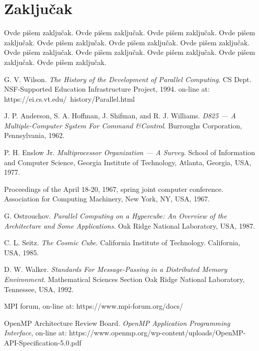 \documentclass[a4paper]{article}
\begin{document}
{	\section{Zaključak}
	\label{sec:zakljucak}
	Ovde pišem zaključak. 
	Ovde pišem zaključak. 
	Ovde pišem zaključak. 
	Ovde pišem zaključak. 
	Ovde pišem zaključak. 
	Ovde pišem zaključak. 
	Ovde pišem zaključak. 
	Ovde pišem zaključak. 
	Ovde pišem zaključak. 
	Ovde pišem zaključak. 
	Ovde pišem zaključak. 
	Ovde pišem zaključak. 
	
	\appendix
	
	\iffalse
	 
	
	\fi
	
	\begin{thebibliography}{50}
		
		 G. V. Wilson. \emph{The History of the Development of Parallel Computing}. CS Dept. NSF-Supported Education Infrastructure Project, 1994. on-line at: https://ei.cs.vt.edu/~history/Parallel.html
		
		 J. P. Anderson, S. A. Hoffman, J. Shifman, and R. J. Williams. \emph{D825 — A Multiple-Computer System For Command \&Control}. Burroughs Corporation, Pennsylvania, 1962.
		
		 P. H. Enslow Jr. \emph{Multiprocessor Organization — A Survey}. School of Information and Computer Science, Georgia Institute of Technology, Atlanta, Georgia, USA, 1977.
		
		 Proceedings of the April 18-20, 1967, spring joint computer conference. Association for Computing Machinery, New York, NY, USA, 1967.
		
		 G. Ostrouchov. \emph{Parallel Computing on a Hypercube: An Overview of the Architecture and Some Applications}. Oak Ridge National Laboratory, USA, 1987.
		
		 C. L. Seitz. \emph{The Cosmic Cube}. California Institute of Technology. California, USA, 1985.
		
		 D. W. Walker. \emph{Standards For Message-Passing in a Distributed Memory Environment}. Mathematical Sciences Section Oak Ridge National Laboratory, Tennessee, USA, 1992.
		
		 MPI forum, on-line at: https://www.mpi-forum.org/docs/
		
		 OpenMP Architecture Review Board. \emph{OpenMP Application Programming Interface}, on-line at: https://www.openmp.org/wp-content/uploads/OpenMP-API-Specification-5.0.pdf
		

\end{thebibliography}}
\end{document}
